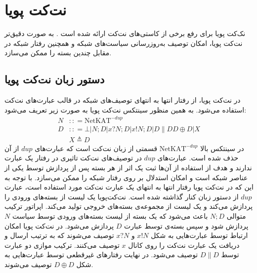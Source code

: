 \section{نت‌کت پویا}
نک‌کت‌ پویا
برای رفع برخی از کاستی‌های نت‌کت ارائه شده است
\cite{dynetkat}.
به صورت دقیق‌تر نت‌کت پویا، امکان توصیف به‌روز‌رسانی سیاست‌های شبکه و همچنین رفتار شبکه در مقابل چندین بسته را ممکن می‌سازد.

\subsection{دستور زبان نت‌کت پویا}
در نت‌کت‌ پویا، از رفتار انتها به انتها‌ی توصیف‌های شبکه در قالب عبارت‌های نت‌کت استفاده می‌شود.
به همین منظور سینتکس نت‌کت‌ پویا به صورت زیر تعریف می‌شود:
\begin{align*}
    N & :: = \mathrm{NetKAT}^{-dup}                    \\
    D & :: = \bot | N;D | x?N;D | x!N;D | D\parallel D
    D \oplus D | X                                     \\
      & X \triangleq D
\end{align*}
در سینتکس بالا
$\mathrm{NetKAT}^{-dup}$
قسمتی از زبان نت‌کت است که عبارت‌های
$dup$
از آن حذف شده است.
عبارت‌های
$dup$
در توصیف‌های نت‌کت تاثیری در رفتار یک عبارت ندارند و هدف از استفاده از آن‌ها ثبت یک اثر از هر بسته پس از پردازش توسط یکی از عناصر شبکه است و امکان استدلال بر روی رفتار شبکه را ممکن می‌سازد.
با توجه به این که در نت‌کت پویا رفتار انتها به انتهای یک عبارت نت‌کت مورد استفاده است، عبارت
$dup$
از دستور زبان کنار گذاشته شده است.
نت‌کت‌پویا یک لیست از بسته‌های ورودی را پردازش می‌کند و یک لیست از مجموعه‌ی بسته‌های خروجی تولید می‌کند.
اپراتور ترکیب متوالی
$N;D$
باعث می‌شود که یک بسته از لیست بسته‌های ورودی توسط سیاست
$N$
پردازش شود و سپس بسته‌ی توسط عبارت
$D$
پردازش می‌شود.
در نت‌کت پویا امکان ارتباط توسط عبارت‌هایی به شکل
$x!N$
و
$x?N$
توصیف می‌شوند که به ترتیب ارسال و دریافت یک عبارت نت‌کت را روی کانال
$x$
توصیف می‌کنند.
ترکیب موازی
دو عبارت توسط
$D \parallel D$
توصیف می‌شود.
در نهایت رفتار‌های غیرقطعی
توسط‌ عبارت‌هایی به شکل
$D \oplus D$
توصیف می‌شوند.

